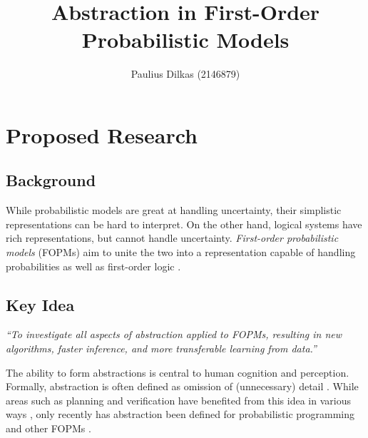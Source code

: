 \documentclass[11pt,english,twocolumn]{article}
\begin{document}
\title{Abstraction in First-Order Probabilistic Models}

\author{Paulius Dilkas (2146879)}
\date{}
\maketitle

\section{Proposed Research}

\subsection{Background}

While probabilistic models are great at handling uncertainty, their
simplistic representations can be hard to interpret. On the other hand, logical
systems have rich representations, but cannot handle uncertainty.
\emph{First-order probabilistic models} (FOPMs) aim to unite the two into a
representation capable of handling probabilities as well as first-order logic
\cite{DBLP:series/sci/BrazAR08}.


\subsection{Key Idea}

\emph{``To investigate all aspects of abstraction applied to FOPMs, resulting in
  new algorithms, faster inference, and more transferable learning from data.''}

The ability to form abstractions is central to human cognition and perception.
Formally, abstraction is often defined as omission of (unnecessary) detail
\cite{doi:10.1086/670300}. While areas such as planning and verification have
benefited from this idea in various ways \cite{saitta2013abstraction}, only
recently has abstraction been defined for probabilistic programming
\cite{DBLP:conf/uai/HoltzenMB17} and other FOPMs
\cite{DBLP:journals/corr/abs-1810-02434}.
\end{document}
